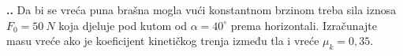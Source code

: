 

\noindent 
\textbf{
\thecjelina.\thezadatak.}
Da bi se vreća puna brašna mogla vući konstantnom brzinom treba sila iznosa $F_0=50\ N$  koja djeluje pod kutom od $\alpha=40^\circ$ prema horizontali. Izračunajte masu vreće ako je koeficijent kinetičkog trenja između tla i vreće $\mu_k=0,35$.

